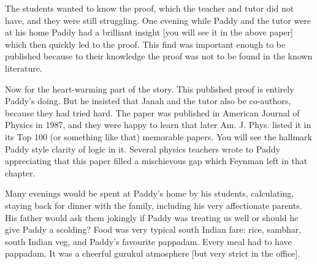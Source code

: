\documentclass[prd, preprint, longbibliography, 11pt]{revtex4-1}
\begin{document}
The students wanted to know the proof, which the teacher and tutor did not have, and they were still struggling. One evening while Paddy and the tutor were
at his home Paddy had a brilliant insight [you will see it in the above paper] which then quickly led to the proof.
This find was important enough to be published because to their knowledge the proof was not to be found in the known literature. 

Now for the heart-warming part of the story. This published proof is entirely Paddy's doing. But he insisted that Janah and the tutor also be co-authors, because they had tried hard.
The paper was published in American Journal of Physics in 1987, and they were happy to learn that later Am. J. Phys. listed it in its Top 100 (or something like that) memorable papers. You will see the hallmark Paddy style clarity of logic in it. Several physics teachers wrote to Paddy appreciating that this paper filled a mischievous gap which Feynman left in that chapter.

Many evenings would be spent at Paddy's home by his students, calculating, staying back for dinner with the family, including his very affectionate parents. His father would ask them jokingly if Paddy was treating us well or should he give Paddy a scolding?  Food was very typical south Indian fare: rice, sambhar, south Indian veg, and Paddy's favourite pappadam. Every meal had to have pappadam.
It was a cheerful gurukul atmosphere [but very strict in the office].
\end{document}
